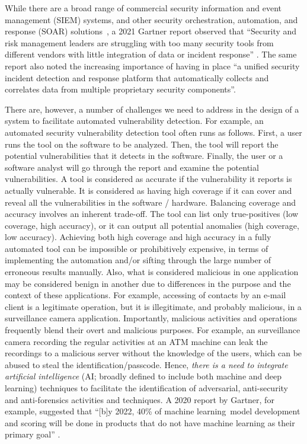 While there are a broad range of commercial security information and
event management (SIEM) systems, and other security orchestration,
automation, and response (SOAR) solutions~\cite{DBLP:journals/csur/IslamBN19},
a 2021 Gartner report observed that ``Security and risk management
leaders are struggling with too many security tools from different
vendors with little integration of data or incident response''
\cite{FirstbrookLawsonGartner2021}. The same report also noted the
increasing importance of having in place ``a unified security incident
detection and response platform that automatically collects and
correlates data from multiple proprietary security components''.

There are, however, a number of challenges we need to address in the
design of a system to facilitate automated vulnerability detection.
For example, an automated security vulnerability detection tool often
runs as follows. First, a user runs the tool on the software to be
analyzed. Then, the tool will report the potential vulnerabilities
that it detects in the software. Finally, the user or a software
analyst will go through the report and examine the potential
vulnerabilities. A tool is considered as accurate if the vulnerability
it reports is actually vulnerable. It is considered as having high
coverage if it can cover and reveal all the vulnerabilities in the
software / hardware. Balancing coverage and accuracy involves an
inherent trade-off. The tool can list only true-positives (low
coverage, high accuracy), or it can output all potential anomalies
(high coverage, low accuracy). Achieving both high coverage and high
accuracy in a fully automated tool can be impossible or prohibitively
expensive, in terms of implementing the automation and/or sifting
through the large number of erroneous results manually.
Also, what is considered malicious in one application may be
considered benign in another due to differences in the purpose and the
context of these applications. For example, accessing of contacts by
an e-mail client is a legitimate operation, but it is illegitimate,
and probably malicious, in a surveillance camera
application. Importantly, malicious activities and operations
frequently blend their overt and malicious purposes. For example, an
surveillance camera recording the regular activities at an ATM machine
can leak the recordings to a malicious server without the knowledge of
the users, which can be abused to steal the
identification/passcode. Hence, {\em there is a need to integrate
artificial intelligence} (AI; broadly defined to include both machine
and deep learning) techniques to facilitate the identification of
adversarial, anti-security and anti-forensics activities and
techniques. A 2020 report by Gartner, for example, suggested that
``[b]y 2022, 40\% of machine learning~model development and scoring
will be done in products that do not have machine learning as their
primary goal'' \cite{RichardsonGartner2020}.

